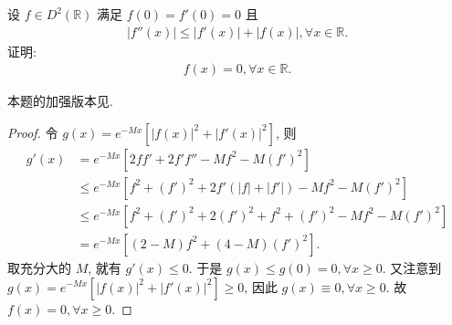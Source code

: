 \documentclass[../../main.tex]{subfiles}
\begin{document}
\begin{example}
设 $f\in D^2(\mathbb{R})$ 满足 $f(0)=f'(0)=0$ 且
\begin{align*}
|f''(x)|\leqslant|f'(x)|+|f(x)|,\forall x\in\mathbb{R}.
\end{align*}
证明:
\begin{align*}
f(x)=0,\forall x\in\mathbb{R}.
\end{align*} 
\end{example}
\begin{note}
本题的加强版本见.
\end{note}
\begin{proof}
令 $g(x)=e^{-Mx}\left[|f(x)|^2+|f'(x)|^2\right]$, 则
\begin{align*}
g'(x)&=e^{-Mx}\left[2ff'+2f'f''-Mf^2-M(f')^2\right]\\
&\leqslant e^{-Mx}\left[f^2+(f')^2+2f'\left(|f|+|f'|\right)-Mf^2-M(f')^2\right]\\
&\leqslant e^{-Mx}\left[f^2+(f')^2+2(f')^2+f^2+(f')^2-Mf^2-M(f')^2\right]\\
&=e^{-Mx}\left[(2 - M)f^2+(4 - M)(f')^2\right].
\end{align*}
取充分大的 $M$, 就有 $g'(x)\leqslant0$. 于是 $g(x)\leqslant g(0)=0,\forall x\geqslant0$.
又注意到 $g(x)=e^{-Mx}\left[|f(x)|^2+|f'(x)|^2\right]\geqslant0$, 因此 $g(x)\equiv0,\forall x\geqslant0$.
故 $f(x)=0,\forall x\geqslant0$. 

\end{proof}
\end{document}
